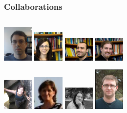 \documentclass{beamer}
\begin{document}
\begin{frame}
  \frametitle{Collaborations}
  \begin{columns}[t]
      \begin{center}
        \includegraphics[width=0.6in]{figures/boris}
        \includegraphics[width=0.6in]{figures/cristina}
        \includegraphics[width=0.6in]{figures/alessandro}
        \includegraphics[width=0.6in]{figures/ken}

        \includegraphics[width=0.6in]{figures/azadeh}
        \includegraphics[width=0.6in]{figures/nuria}
        \includegraphics[width=0.6in]{figures/david}
        \includegraphics[width=0.6in]{figures/gabriel}


\end{center}
\end{columns}
\end{frame}
\end{document}
